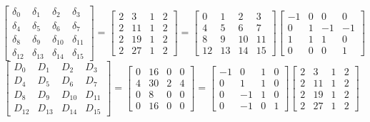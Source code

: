 \documentclass{article}%
\begin{document}
\[%
\left[\begin{matrix}\delta_{0} & \delta_{1} & \delta_{2} & \delta_{3}\\\delta_{4} & \delta_{5} & \delta_{6} & \delta_{7}\\\delta_{8} & \delta_{9} & \delta_{10} & \delta_{11}\\\delta_{12} & \delta_{13} & \delta_{14} & \delta_{15}\end{matrix}\right] = \left[\begin{matrix}2 & 3 & 1 & 2\\2 & 11 & 1 & 2\\2 & 19 & 1 & 2\\2 & 27 & 1 & 2\end{matrix}\right] = \left[\begin{matrix}0 & 1 & 2 & 3\\4 & 5 & 6 & 7\\8 & 9 & 10 & 11\\12 & 13 & 14 & 15\end{matrix}\right] \left[\begin{matrix}-1 & 0 & 0 & 0\\0 & 1 & -1 & -1\\1 & 1 & 1 & 0\\0 & 0 & 0 & 1\end{matrix}\right]%
\]%
\[%
\left[\begin{matrix}D_{0} & D_{1} & D_{2} & D_{3}\\D_{4} & D_{5} & D_{6} & D_{7}\\D_{8} & D_{9} & D_{10} & D_{11}\\D_{12} & D_{13} & D_{14} & D_{15}\end{matrix}\right] = \left[\begin{matrix}0 & 16 & 0 & 0\\4 & 30 & 2 & 4\\0 & 8 & 0 & 0\\0 & 16 & 0 & 0\end{matrix}\right] = \left[\begin{matrix}-1 & 0 & 1 & 0\\0 & 1 & 1 & 0\\0 & -1 & 1 & 0\\0 & -1 & 0 & 1\end{matrix}\right] \left[\begin{matrix}2 & 3 & 1 & 2\\2 & 11 & 1 & 2\\2 & 19 & 1 & 2\\2 & 27 & 1 & 2\end{matrix}\right]%
\]%
\end{document}
